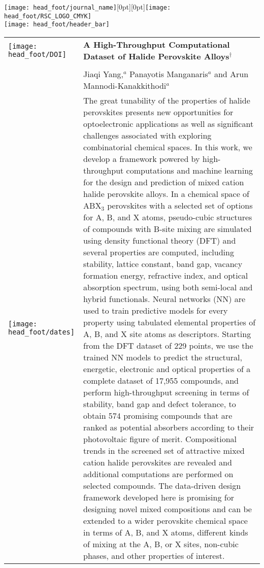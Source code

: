 \documentclass[twoside,twocolumn,9pt]{article}
\begin{document}
  \begin{@twocolumnfalse}
{\texttt{[image: head\_foot/journal\_name]}\hfill\raisebox{0pt}[0pt][0pt]{\texttt{[image: head\_foot/RSC\_LOGO\_CMYK]}}\\[1ex]
\texttt{[image: head\_foot/header\_bar]}}\par
\vspace{1em}
\sffamily
\begin{tabular}{m{4.5cm} p{13.5cm} }

\texttt{[image: head\_foot/DOI]} & \noindent\LARGE{\textbf{A High-Throughput Computational Dataset of Halide Perovskite Alloys$^\dag$}} \\%
\vspace{0.3cm} & \vspace{0.3cm} \\

 & \noindent\large{Jiaqi Yang,\textit{$^{a}$} Panayotis Manganaris\textit{$^{a}$} and Arun Mannodi-Kanakkithodi\textit{$^{a}$}} \\%

\texttt{[image: head\_foot/dates]} & \noindent\normalsize{The great tunability of the properties of halide perovskites presents new opportunities for optoelectronic applications as well as significant challenges associated with exploring combinatorial chemical spaces. In this work, we develop a framework powered by high-throughput computations and machine learning for the design and prediction of mixed cation halide perovskite alloys. In a chemical space of ABX$_{3}$ perovskites with a selected set of options for A, B, and X atoms, pseudo-cubic structures of compounds with B-site mixing are simulated using density functional theory (DFT) and several properties are computed, including stability, lattice constant, band gap, vacancy formation energy, refractive index, and optical absorption spectrum, using both semi-local and hybrid functionals. Neural networks (NN) are used to train predictive models for every property using tabulated elemental properties of A, B, and X site atoms as descriptors. Starting from the DFT dataset of 229 points, we use the trained NN models to predict the structural, energetic, electronic and optical properties of a complete dataset of 17,955 compounds, and perform high-throughput screening in terms of stability, band gap and defect tolerance, to obtain 574 promising compounds that are ranked as potential absorbers according to their photovoltaic figure of merit. Compositional trends in the screened set of attractive mixed cation halide perovskites are revealed and additional computations are performed on selected compounds. The data-driven design framework developed here is promising for designing novel mixed compositions and can be extended to a wider perovskite chemical space in terms of A, B, and X atoms, different kinds of mixing at the A, B, or X sites, non-cubic phases, and other properties of interest.} 

\end{tabular}

 \end{@twocolumnfalse} \vspace{0.6cm}
\end{document}
